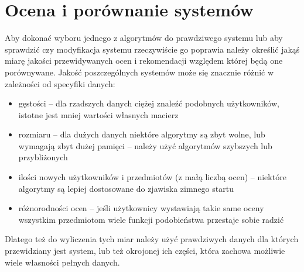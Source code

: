 \documentclass{pracamgr}
\begin{document}
 \chapter{Ocena i porównanie systemów}
  Aby dokonać wyboru jednego z algorytmów do prawdziwego systemu lub aby sprawdzić czy modyfikacja systemu rzeczywiście go poprawia należy
  określić jakąś miarę jakości przewidywanych ocen i rekomendacji względem której będą one porównywane.\newline
  Jakość poszczególnych systemów może się znacznie różnić w zależności od specyfiki danych:
  \begin{itemize}\itemsep1pt \parskip0pt 
   \item gęstości -- dla rzadszych danych ciężej znaleźć podobnych użytkowników, istotne jest mniej wartości własnych macierz
   \item rozmiaru -- dla dużych danych niektóre algorytmy są zbyt wolne, lub wymagają zbyt dużej pamięci
          -- należy użyć algorytmów szybszych lub przybliżonych 
   \item ilości nowych użytkowników i przedmiotów (z małą liczbą ocen) -- niektóre algorytmy są lepiej dostosowane do zjawiska zimnego startu
   \item różnorodności ocen -- jeśli użytkownicy wystawiają takie same oceny wszystkim przedmiotom wiele funkcji podobieństwa przestaje sobie radzić 
  \end{itemize}
  Dlatego też do wyliczenia tych miar należy użyć prawdziwych danych dla których przewidziany jest system, lub też okrojonej ich części,
  która zachowa możliwie wiele własności pełnych danych.
\end{document}
